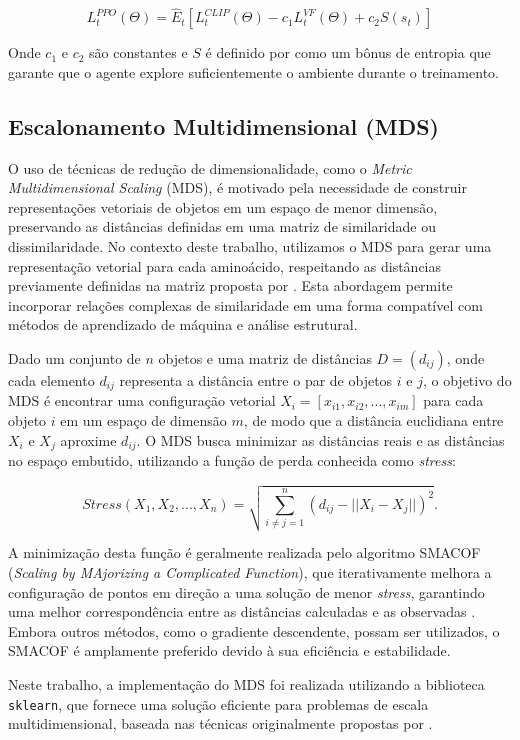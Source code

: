 \begin{equation}
   L_t ^{PPO} (\Theta) = \hat{E}_t[L_t ^{CLIP} (\Theta) - c_1 L_t ^{VF} (\Theta) + c_2 S(s_t)]
\end{equation}

Onde $c_1$ e $c_2$ são constantes e $S$ é definido por \cite{PPO} como um bônus de entropia que garante que o agente explore suficientemente o ambiente durante o treinamento.


\subsection{Escalonamento Multidimensional (MDS)}  
\label{subsection:MDS}  

O uso de técnicas de redução de dimensionalidade, como o \textit{Metric Multidimensional Scaling} (MDS),
é motivado pela necessidade de construir representações vetoriais de objetos em um espaço de menor dimensão,
preservando as distâncias definidas em uma matriz de similaridade ou dissimilaridade.
No contexto deste trabalho, utilizamos o MDS para gerar uma representação vetorial para cada aminoácido,
respeitando as distâncias previamente definidas na matriz proposta por \cite{aminodist}. 
Esta abordagem permite incorporar relações complexas de similaridade em uma forma compatível com métodos de aprendizado de máquina e
análise estrutural.  

Dado um conjunto de $n$ objetos e uma matriz de distâncias $D = (d_{ij})$,
onde cada elemento $d_{ij}$ representa a distância entre o par de objetos $i$ e $j$,
o objetivo do MDS é encontrar uma configuração vetorial $X_i = [x_{i1}, x_{i2}, ..., x_{im}]$ 
para cada objeto $i$ em um espaço de dimensão $m$,
de modo que a distância euclidiana entre $X_i$ e $X_j$ aproxime $d_{ij}$. 
O MDS busca minimizar as distâncias reais e as distâncias no espaço embutido, 
utilizando a função de perda conhecida como \textit{stress}:

\begin{equation}
    Stress(X_1, X_2, ..., X_n) = \sqrt{\sum_{i \neq j = 1}^{n} (d_{ij} - ||X_i - X_j||)^2}.
\end{equation}

A minimização desta função é geralmente realizada pelo algoritmo 
SMACOF (\textit{Scaling by MAjorizing a Complicated Function}),
que iterativamente melhora a configuração de pontos em direção a uma solução de menor \textit{stress},
garantindo uma melhor correspondência entre as distâncias calculadas e as observadas \cite{mds}.
Embora outros métodos, como o gradiente descendente, possam ser utilizados, 
o SMACOF é amplamente preferido devido à sua eficiência e estabilidade.

Neste trabalho, 
a implementação do MDS foi realizada utilizando a biblioteca \texttt{sklearn}, 
que fornece uma solução eficiente para problemas de escala multidimensional, 
baseada nas técnicas originalmente propostas por \cite{mds}.













